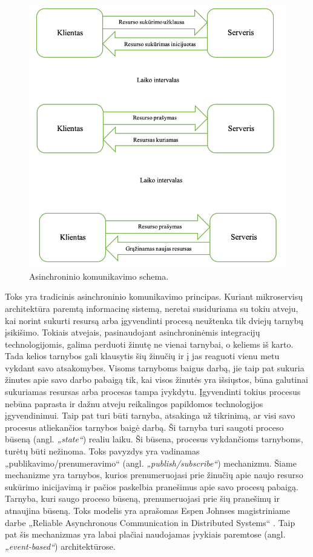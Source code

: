 \begin{figure}[H]
  \centering
  \includegraphics[scale=0.45]{img/asynchronous-communication}
  \caption{Asinchroninio komunikavimo schema.}
  \label{img:asynchronous-communication}
\end{figure}
\break

Toks yra tradicinis asinchroninio komunikavimo principas. Kuriant mikroservisų architektūra paremtą informacinę sistemą,
neretai susiduriama su tokiu atveju, kai norint sukurti resursą arba įgyvendinti procesą neužtenka tik dviejų tarnybų įsikišimo.
Tokiais atvejais, pasinaudojant asinchroninėmis integracijų technologijomis, galima perduoti žinutę ne vienai tarnybai, o keliems iš karto.
Tada kelios tarnybos gali klausytis šių žinučių ir į jas reaguoti vienu metu vykdant savo atsakomybes. Visoms tarnyboms baigus darbą,
jie taip pat sukuria žinutes apie savo darbo pabaigą tik, kai visos žinutės yra išsiųstos, būna galutinai sukuriamas resursas arba procesas
tampa įvykdytu. Įgyvendinti tokius procesus nebūna paprasta ir dažnu atveju reikalingos papildomos technologijos įgyvendinimui.
Taip pat turi būti tarnyba, atsakinga už tikrinimą, ar visi savo procesus atliekančios tarnybos baigė darbą. Ši tarnyba turi
saugoti proceso būseną (angl. \textit{„state“}) realiu laiku. Ši būsena, procesus vykdančioms tarnyboms, turėtų būti nežinoma.
Toks pavyzdys yra vadinamas „publikavimo/prenumeravimo“ (angl. \textit{„publish/subscribe“}) mechanizmu. Šiame mechanizme yra
tarnybos, kurios prenumeruojasi prie žinučių apie naujo resurso sukūrimo inicijavimą ir pačios paskelbia pranešimus apie savo procesų pabaigą.
Tarnyba, kuri saugo proceso būseną, prenumeruojasi prie šių pranešimų ir atnaujina būseną. Toks modelis yra aprašomas Espen Johnses magistriniame darbe
„Reliable Asynchronous Communication in Distributed Systems“ \cite{MstrThs1}. Taip pat šis mechanizmas yra labai plačiai naudojamas
įvykiais paremtose (angl. \textit{„event-based“}) architektūrose.

